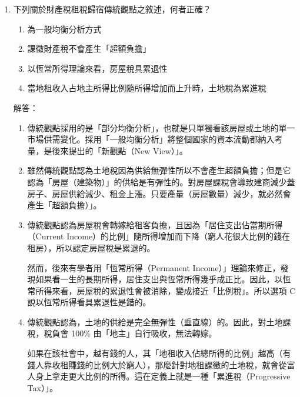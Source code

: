\documentclass[12pt, a4paper]{article}
\begin{document}
\begin{enumerate}
    \item 下列關於財產稅租稅歸宿傳統觀點之敘述，何者正確？
    \begin{enumerate}[label=\Alph*.]
        \item 為一般均衡分析方式
        \item 課徵財產稅不會產生「超額負擔」
        \item 以恆常所得理論來看，房屋稅具累退性
        \item 當地租收入占地主所得比例隨所得增加而上升時，土地稅為累進稅
    \end{enumerate}
    解答：
    \begin{enumerate}[label=\Alph*.]
        \item 傳統觀點採用的是「部分均衡分析」，也就是只單獨看該房屋或土地的單一市場供需變化。採用「一般均衡分析」將整個國家的資本流動都納入考量，是後來提出的「新觀點（New View）」。
        \item 雖然傳統觀點認為土地稅因為供給無彈性所以不會產生超額負擔；但是它認為「房屋（建築物）」的供給是有彈性的。對房屋課稅會導致建商減少蓋房子、房屋供給減少、租金上漲。只要產量（房屋數量）減少，就必然會產生「超額負擔）」。
        \item 傳統觀點認為房屋稅會轉嫁給租客負擔，且因為「居住支出佔當期所得（Current Income）的比例」隨所得增加而下降（窮人花很大比例的錢在租房），所以認定房屋稅是累退的。

        然而，後來有學者用「恆常所得（Permanent Income）」理論來修正，發現如果看一生的長期所得，居住支出與恆常所得幾乎成正比。因此，以恆常所得來看，房屋稅的累退性會被消除，變成接近「比例稅」。所以選項 C 說以恆常所得看具累退性是錯的。
        \item 傳統觀點認為，土地的供給是完全無彈性（垂直線）的。因此，對土地課稅，稅負會 100\% 由「地主」自行吸收，無法轉嫁。

        如果在該社會中，越有錢的人，其「地租收入佔總所得的比例」越高（有錢人靠收租賺錢的比例大於窮人），那麼針對地租課徵的土地稅，就會從富人身上拿走更大比例的所得。這在定義上就是一種「累進稅（Progressive Tax）」。
    \end{enumerate}


\end{enumerate}
\end{document}
